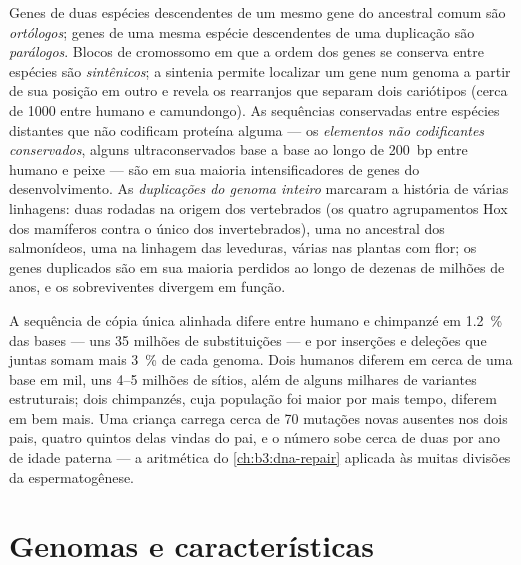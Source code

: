 \begin{definition}\label{def:b3:genomics:comparative}
Genes de duas espécies descendentes de um mesmo gene do ancestral
comum são \emph{ortólogos}; genes de uma mesma espécie descendentes de
uma duplicação são \emph{parálogos}. Blocos de cromossomo em que a
ordem dos genes se conserva entre espécies são \emph{sintênicos}; a
sintenia permite localizar um gene num genoma a partir de sua posição
em outro e revela os rearranjos que separam dois cariótipos (cerca de
\num{1000} entre humano e camundongo). As sequências conservadas entre
espécies distantes que não codificam proteína alguma --- os
\emph{elementos não codificantes conservados}, alguns
ultraconservados base a base ao longo de \qty{200}{bp} entre humano e
peixe --- são em sua maioria intensificadores de genes do
desenvolvimento. As \emph{duplicações do genoma inteiro} marcaram a
história de várias linhagens: duas rodadas na origem dos vertebrados
(os quatro agrupamentos Hox dos mamíferos contra o único dos
invertebrados), uma no ancestral dos salmonídeos, uma na linhagem das
leveduras, várias nas plantas com flor; os genes duplicados são em sua
maioria perdidos ao longo de dezenas de milhões de anos, e os
sobreviventes divergem em função.
\end{definition}

\begin{example}\label{ex:b3:genomics:chimp}
A sequência de cópia única alinhada difere entre humano e chimpanzé em
\qty{1.2}{\%} das bases --- uns \num{35} milhões de substituições --- e
por inserções e deleções que juntas somam mais \qty{3}{\%} de cada
genoma. Dois humanos diferem em cerca de uma base em mil, uns
\numrange{4}{5} milhões de sítios, além de alguns milhares de
variantes estruturais; dois chimpanzés, cuja população foi maior por
mais tempo, diferem em bem mais. Uma criança carrega cerca de
\num{70} mutações novas ausentes nos dois pais, quatro quintos delas
vindas do pai, e o número sobe cerca de duas por ano de idade paterna
--- a aritmética do \cref{ch:b3:dna-repair} aplicada às muitas divisões
da espermatogênese.
\end{example}

\section{Genomas e características}

